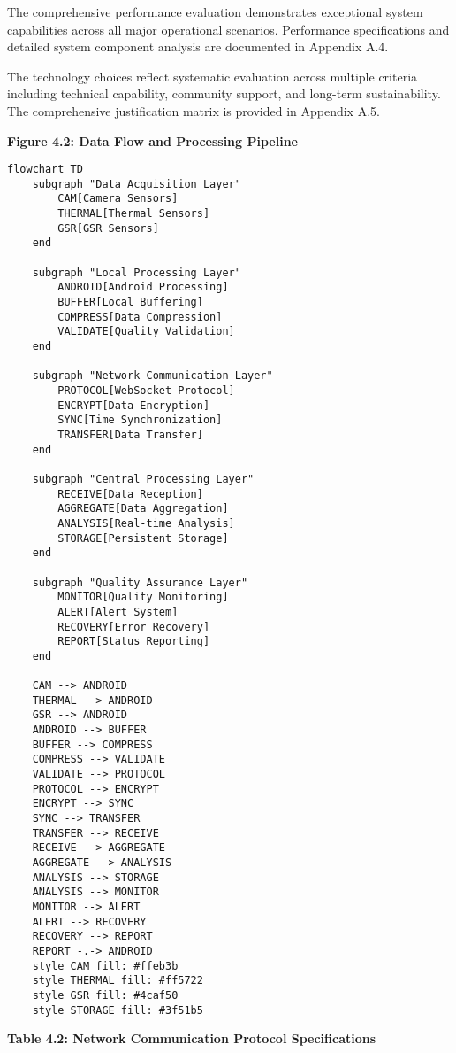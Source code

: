 \documentclass[12pt,a4paper]{article}
\begin{document}
The comprehensive performance evaluation demonstrates exceptional system capabilities across all major operational
scenarios. Performance specifications and detailed system component analysis are documented in Appendix A.4.

The technology choices reflect systematic evaluation across multiple criteria including technical capability, community
support, and long-term sustainability. The comprehensive justification matrix is provided in Appendix A.5.

\textbf{Figure 4.2: Data Flow and Processing Pipeline}

\begin{verbatim}
flowchart TD
    subgraph "Data Acquisition Layer"
        CAM[Camera Sensors]
        THERMAL[Thermal Sensors]
        GSR[GSR Sensors]
    end

    subgraph "Local Processing Layer"
        ANDROID[Android Processing]
        BUFFER[Local Buffering]
        COMPRESS[Data Compression]
        VALIDATE[Quality Validation]
    end

    subgraph "Network Communication Layer"
        PROTOCOL[WebSocket Protocol]
        ENCRYPT[Data Encryption]
        SYNC[Time Synchronization]
        TRANSFER[Data Transfer]
    end

    subgraph "Central Processing Layer"
        RECEIVE[Data Reception]
        AGGREGATE[Data Aggregation]
        ANALYSIS[Real-time Analysis]
        STORAGE[Persistent Storage]
    end

    subgraph "Quality Assurance Layer"
        MONITOR[Quality Monitoring]
        ALERT[Alert System]
        RECOVERY[Error Recovery]
        REPORT[Status Reporting]
    end

    CAM --> ANDROID
    THERMAL --> ANDROID
    GSR --> ANDROID
    ANDROID --> BUFFER
    BUFFER --> COMPRESS
    COMPRESS --> VALIDATE
    VALIDATE --> PROTOCOL
    PROTOCOL --> ENCRYPT
    ENCRYPT --> SYNC
    SYNC --> TRANSFER
    TRANSFER --> RECEIVE
    RECEIVE --> AGGREGATE
    AGGREGATE --> ANALYSIS
    ANALYSIS --> STORAGE
    ANALYSIS --> MONITOR
    MONITOR --> ALERT
    ALERT --> RECOVERY
    RECOVERY --> REPORT
    REPORT -.-> ANDROID
    style CAM fill: #ffeb3b
    style THERMAL fill: #ff5722
    style GSR fill: #4caf50
    style STORAGE fill: #3f51b5
\end{verbatim}

\textbf{Table 4.2: Network Communication Protocol Specifications}
\end{document}
